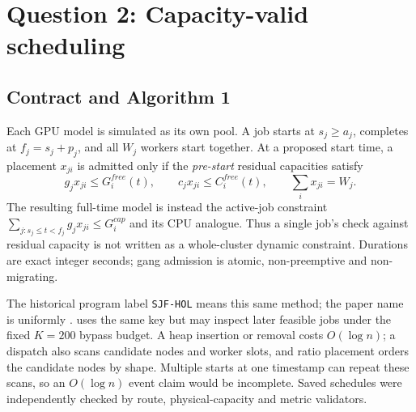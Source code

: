 \section{Question 2: Capacity-valid scheduling}
\label{sec:r2q2}
\subsection{Contract and Algorithm 1}
Each GPU model is simulated as its own pool. A job starts at $s_j\ge a_j$, completes at $f_j=s_j+p_j$, and all $W_j$ workers start together. At a proposed start time, a placement $x_{ji}$ is admitted only if the \emph{pre-start} residual capacities satisfy
\begin{equation}
 g_jx_{ji}\le G_i^{free}(t),\qquad c_jx_{ji}\le C_i^{free}(t),\qquad \sum_i x_{ji}=W_j.
\end{equation}
The resulting full-time model is instead the active-job constraint $\sum_{j:s_j\le t<f_j}g_jx_{ji}\le G_i^{cap}$ and its CPU analogue. Thus a single job's check against residual capacity is not written as a whole-cluster dynamic constraint. Durations are exact integer seconds; gang admission is atomic, non-preemptive and non-migrating.


The historical program label \texttt{SJF-HOL} means this same method; the paper name is uniformly .  uses the same key but may inspect later feasible jobs under the fixed $K=200$ bypass budget. A heap insertion or removal costs $O(\log n)$; a dispatch also scans candidate nodes and worker slots, and ratio placement orders the candidate nodes by shape. Multiple starts at one timestamp can repeat these scans, so an $O(\log n)$ event claim would be incomplete. Saved schedules were independently checked by route, physical-capacity and metric validators.

